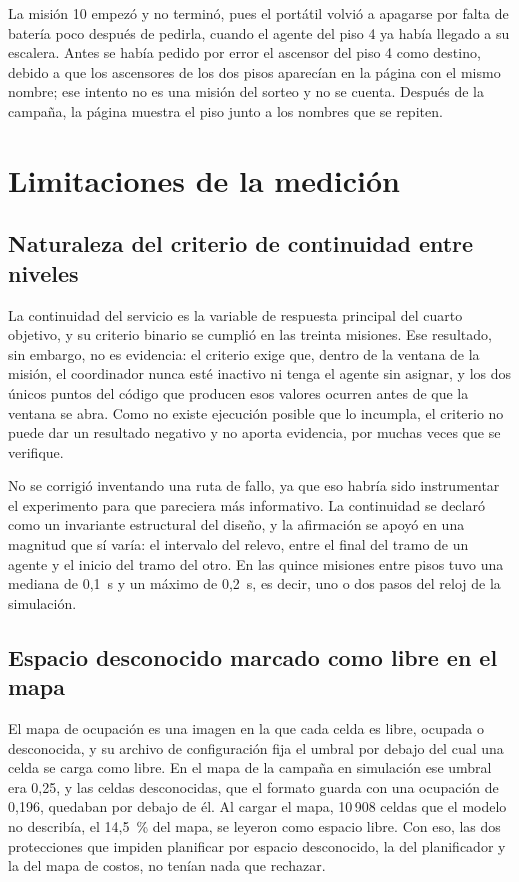 La misión 10 empezó y no terminó, pues el portátil volvió a apagarse por falta de batería poco después de pedirla, cuando el agente del piso 4 ya había llegado a su escalera. Antes se había pedido por error el ascensor del piso 4 como destino, debido a que los ascensores de los dos pisos aparecían en la página con el mismo nombre; ese intento no es una misión del sorteo y no se cuenta. Después de la campaña, la página muestra el piso junto a los nombres que se repiten.

\section{Limitaciones de la medición}
\label{sec:limitaciones}

\subsection{Naturaleza del criterio de continuidad entre niveles}

La continuidad del servicio es la variable de respuesta principal del cuarto objetivo, y su criterio binario se cumplió en las treinta misiones. Ese resultado, sin embargo, no es evidencia: el criterio exige que, dentro de la ventana de la misión, el coordinador nunca esté inactivo ni tenga el agente sin asignar, y los dos únicos puntos del código que producen esos valores ocurren antes de que la ventana se abra. Como no existe ejecución posible que lo incumpla, el criterio no puede dar un resultado negativo y no aporta evidencia, por muchas veces que se verifique.

No se corrigió inventando una ruta de fallo, ya que eso habría sido instrumentar el experimento para que pareciera más informativo. La continuidad se declaró como un invariante estructural del diseño, y la afirmación se apoyó en una magnitud que sí varía: el intervalo del relevo, entre el final del tramo de un agente y el inicio del tramo del otro. En las quince misiones entre pisos tuvo una mediana de 0,1~s y un máximo de 0,2~s, es decir, uno o dos pasos del reloj de la simulación.

\subsection{Espacio desconocido marcado como libre en el mapa}

El mapa de ocupación es una imagen en la que cada celda es libre, ocupada o desconocida, y su archivo de configuración fija el umbral por debajo del cual una celda se carga como libre. En el mapa de la campaña en simulación ese umbral era 0,25, y las celdas desconocidas, que el formato guarda con una ocupación de 0,196, quedaban por debajo de él. Al cargar el mapa, 10\,908 celdas que el modelo no describía, el 14,5~\% del mapa, se leyeron como espacio libre. Con eso, las dos protecciones que impiden planificar por espacio desconocido, la del planificador y la del mapa de costos, no tenían nada que rechazar.

